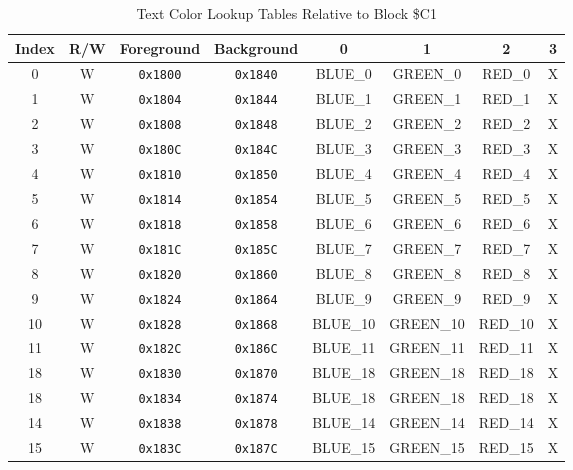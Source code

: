 \begin{table}[ht]
    \begin{center}
        \begin{tabular}{|c|c|c|c|c|c|c|c|} \hline
            Index & R/W & Foreground & Background & 0 & 1 & 2 & 3 \\ \hline\hline
            0 & W & \verb+0x1800+ & \verb+0x1840+ & BLUE\_0 & GREEN\_0 & RED\_0 & X \\ \hline
            1 & W & \verb+0x1804+ & \verb+0x1844+ & BLUE\_1 & GREEN\_1 & RED\_1 & X \\ \hline
            2 & W & \verb+0x1808+ & \verb+0x1848+ & BLUE\_2 & GREEN\_2 & RED\_2 & X \\ \hline
            3 & W & \verb+0x180C+ & \verb+0x184C+ & BLUE\_3 & GREEN\_3 & RED\_3 & X \\ \hline
            4 & W & \verb+0x1810+ & \verb+0x1850+ & BLUE\_4 & GREEN\_4 & RED\_4 & X \\ \hline
            5 & W & \verb+0x1814+ & \verb+0x1854+ & BLUE\_5 & GREEN\_5 & RED\_5 & X \\ \hline
            6 & W & \verb+0x1818+ & \verb+0x1858+ & BLUE\_6 & GREEN\_6 & RED\_6 & X \\ \hline
            7 & W & \verb+0x181C+ & \verb+0x185C+ & BLUE\_7 & GREEN\_7 & RED\_7 & X \\ \hline
            8 & W & \verb+0x1820+ & \verb+0x1860+ & BLUE\_8 & GREEN\_8 & RED\_8 & X \\ \hline
            9 & W & \verb+0x1824+ & \verb+0x1864+ & BLUE\_9 & GREEN\_9 & RED\_9 & X \\ \hline
            10 & W & \verb+0x1828+ & \verb+0x1868+ & BLUE\_10 & GREEN\_10 & RED\_10 & X \\ \hline
            11 & W & \verb+0x182C+ & \verb+0x186C+ & BLUE\_11 & GREEN\_11 & RED\_11 & X \\ \hline
            18 & W & \verb+0x1830+ & \verb+0x1870+ & BLUE\_18 & GREEN\_18 & RED\_18 & X \\ \hline
            18 & W & \verb+0x1834+ & \verb+0x1874+ & BLUE\_18 & GREEN\_18 & RED\_18 & X \\ \hline
            14 & W & \verb+0x1838+ & \verb+0x1878+ & BLUE\_14 & GREEN\_14 & RED\_14 & X \\ \hline
            15 & W & \verb+0x183C+ & \verb+0x187C+ & BLUE\_15 & GREEN\_15 & RED\_15 & X \\ \hline
        \end{tabular}
    \end{center}
    \caption{Text Color Lookup Tables Relative to Block \$C1}
    \label{tab:text_luts_relative}
\end{table}

